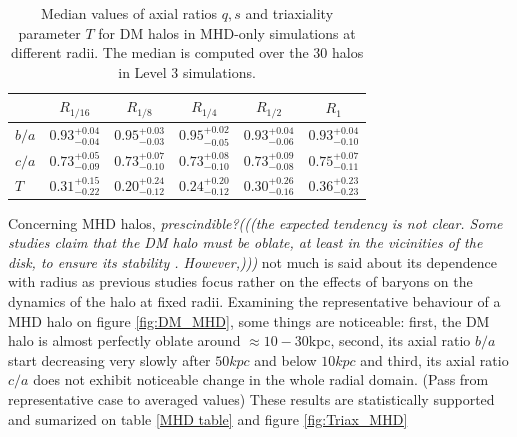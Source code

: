 \documentclass[a4paper,fleqn,usenatbib]{mnras}
\begin{document}
\begin{table}
\setlength{\tabcolsep}{3pt}
\begin{center}
\begin{tabular}{l|ccccc}
 &$R_{1/16}$& $R_{1/8}$& $R_{1/4}$& $R_{1/2}$& $R_1$\\
\hline 
$b/a$ &$0.93^{+0.04}_{-0.04}$&$0.95^{+0.03}_{-0.03}$&$0.95^{+0.02}_{-0.05}$&$0.93^{+0.04}_{-0.06}$&$0.93^{+0.04}_{-0.10}$\\[0.1cm]
$c/a$ &$0.73^{+0.05}_{-0.09}$&$0.73^{+0.07}_{-0.10}$&$0.73^{+0.08}_{-0.10}$&$0.73^{+0.09}_{-0.08}$&$0.75^{+0.07}_{-0.11}$\\[0.1cm] 
$T$ &$0.31^{+0.15}_{-0.22}$&$0.20^{+0.24}_{-0.12}$&$0.24^{+0.20}_{-0.12}$&$0.30^{+0.26}_{-0.16}$&$0.36^{+0.23}_{-0.23}$\\[0.1cm] 
\end{tabular}
\end{center}
\caption{Median values of axial ratios $q,s$ and triaxiality parameter
  $T$ for DM halos in MHD-only simulations at different radii. The
  median is computed over the 30 halos in Level 3 simulations.}  
\label{table:median_axial_ratio_MHD}
\end{table}

Concerning MHD halos, \textit{prescindible?(((the expected tendency is
  not clear. Some studies claim that the DM halo must be oblate, at
  least in the vicinities of the disk, to ensure its stability
  . However,)))} not much is said about its
dependence with radius as previous studies focus rather on the effects
of baryons on the dynamics of the halo at fixed radii. Examining the
representative behaviour of a MHD halo on figure \ref{fig:DM_MHD},
some things are noticeable: first, the DM halo is almost perfectly
oblate around $\approx 10-30$kpc, second, its axial ratio $b/a$ start
decreasing very slowly after $50kpc$ and below $10kpc$ and third, its
axial ratio $c/a$ does not exhibit noticeable change in the whole
radial domain. (Pass from representative case to averaged values)
These results are statistically supported and sumarized on table
\ref{MHD table} and figure \ref{fig:Triax_MHD} 
\end{document}
